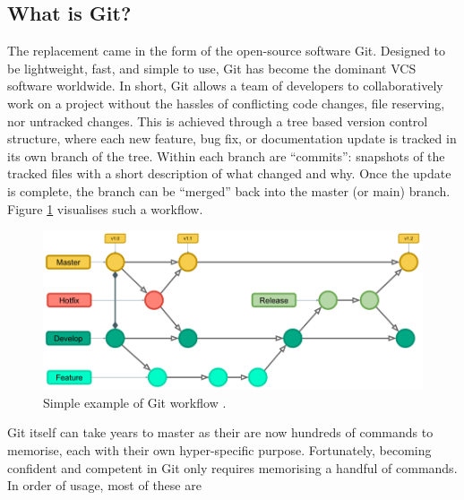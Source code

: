 \documentclass[11pt]{article}
\begin{document}
\subsection{What is Git?}

The replacement came in the form of the open-source software Git. Designed to be lightweight, fast, and simple to use, Git has become the dominant VCS software worldwide. In short, Git allows a team of developers to collaboratively work on a project without the hassles of conflicting code changes, file reserving, nor untracked changes. This is achieved through a tree based version control structure, where each new feature, bug fix, or documentation update is tracked in its own branch of the tree. Within each branch are ``commits'': snapshots of the tracked files with a short description of what changed and why. Once the update is complete, the branch can be ``merged'' back into the master (or main) branch. Figure \ref{fig:git-basic-usage} visualises such a workflow.

\begin{figure}[t!]
    \centering
    \includegraphics[width=1.0\textwidth]{figures/git_tree.png}
    \caption{Simple example of Git workflow \cite{git-flow}.}
    \label{fig:git-basic-usage}
\end{figure}

Git itself can take years to master as their are now hundreds of commands to memorise, each with their own hyper-specific purpose. Fortunately, becoming confident and competent in Git only requires memorising a handful of commands. In order of usage, most of these are
\end{document}
